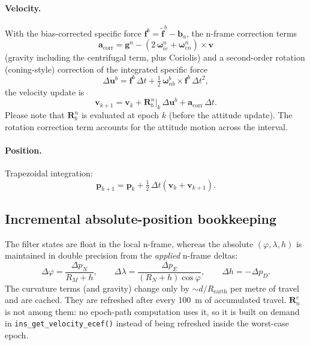 \documentclass[11pt,a4paper]{article}
\newcommand{\vect}[1]{\bm{#1}}
\newcommand{\mat}[1]{\bm{#1}}
\newcommand{\nframe}{n}
\newcommand{\bframe}{b}
\newcommand{\eframe}{e}
\newcommand{\Rbn}{\mat{R}_{\bframe}^{\nframe}}
\newcommand{\Rne}{\mat{R}_{\nframe}^{\eframe}}
\newcommand{\dt}{\Delta t}
\newcommand{\code}[1]{\texttt{#1}}
\begin{document}
\paragraph{Velocity.} With the bias-corrected specific force
$\vect{f}^\bframe = \tilde{\vect{f}}^\bframe - \vect{b}_a$, the n-frame
correction terms
\begin{equation}
  \vect{a}_{\text{corr}}
  = \vect{g}^\nframe
  - \left(2\,\vect{\omega}^\nframe_{i\eframe}
        + \vect{\omega}^\nframe_{\eframe\nframe}\right)
    \times \vect{v}
\end{equation}
(gravity including the centrifugal term, plus Coriolis) and a second-order
rotation (coning-style) correction of the integrated specific force
\cite{titterton2004,wendel2011}
\begin{equation}
  \Delta\vect{u}^\bframe
  = \vect{f}^\bframe\,\dt
  + \tfrac{1}{2}\,\vect{\omega}^\bframe_{\nframe\bframe}
    \times \vect{f}^\bframe\,\dt^2 ,
\end{equation}
the velocity update is
\begin{equation}
  \vect{v}_{k+1} = \vect{v}_k + \Rbn\big|_k\,\Delta\vect{u}^\bframe
                 + \vect{a}_{\text{corr}}\,\dt .
\end{equation}
Please note that $\Rbn$ is evaluated at epoch $k$ (before the attitude update).
The rotation correction term accounts for the attitude motion across
the interval.

\paragraph{Position.} Trapezoidal integration:
\begin{equation}
  \vect{p}_{k+1} = \vect{p}_k
  + \tfrac{1}{2}\,\dt\left(\vect{v}_k + \vect{v}_{k+1}\right).
\end{equation}

\subsection{Incremental absolute-position bookkeeping}
\label{sec:llh}

The filter states are float in the local n-frame, whereas the absolute
$(\varphi, \lambda, h)$ is maintained in double precision from the
\emph{applied} n-frame deltas:
\begin{equation}
  \Delta\varphi = \frac{\Delta p_N}{R_M + h}, \qquad
  \Delta\lambda = \frac{\Delta p_E}{(R_N + h)\cos\varphi}, \qquad
  \Delta h = -\Delta p_D .
\end{equation}
The curvature terms (and gravity) change only by
$\sim d / R_{\text{earth}}$ per metre of travel and are cached. They are
refreshed after every \SI{100}{\metre} of accumulated travel. $\Rne$ is
not among them: no epoch-path computation uses it, so it is
built on demand in \code{ins\_\allowbreak{}get\_\allowbreak{}velocity\_\allowbreak{}ecef()}
instead of being refreshed inside the worst-case epoch.
\end{document}

